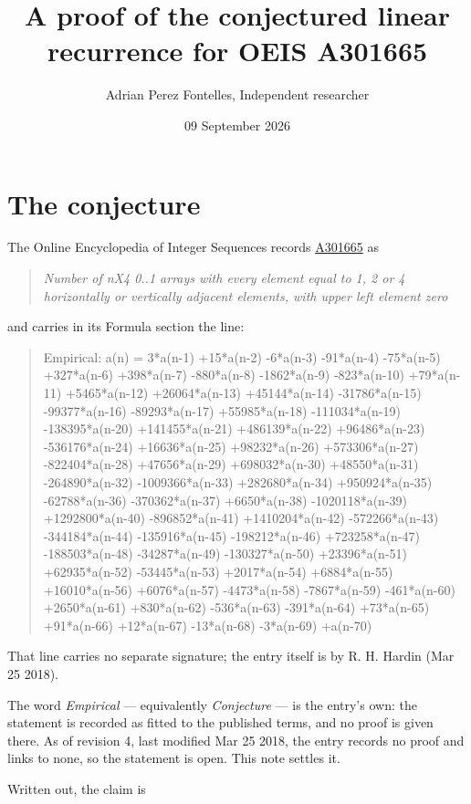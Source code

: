 \documentclass[11pt]{article}
\title{A proof of the conjectured linear recurrence for OEIS A301665}
\author{Adrian Perez Fontelles, Independent researcher}
\date{09 September 2026}
\theoremstyle{definition}
\begin{document}
\maketitle
\section{The conjecture}

The Online Encyclopedia of Integer Sequences records \href{https://oeis.org/A301665}{A301665} as

\begin{quote}\itshape Number of nX4 0..1 arrays with every element equal to 1, 2 or 4 horizontally or vertically adjacent elements, with upper left element zero\end{quote}

and carries in its Formula section the line:

\begin{quote}\ttfamily Empirical: a(n) = 3*a(n-1) +15*a(n-2) -6*a(n-3) -91*a(n-4) -75*a(n-5) +327*a(n-6) +398*a(n-7) -880*a(n-8) -1862*a(n-9) -823*a(n-10) +79*a(n-11) +5465*a(n-12) +26064*a(n-13) +45144*a(n-14) -31786*a(n-15) -99377*a(n-16) -89293*a(n-17) +55985*a(n-18) -111034*a(n-19) -138395*a(n-20) +141455*a(n-21) +486139*a(n-22) +96486*a(n-23) -536176*a(n-24) +16636*a(n-25) +98232*a(n-26) +573306*a(n-27) -822404*a(n-28) +47656*a(n-29) +698032*a(n-30) +48550*a(n-31) -264890*a(n-32) -1009366*a(n-33) +282680*a(n-34) +950924*a(n-35) -62788*a(n-36) -370362*a(n-37) +6650*a(n-38) -1020118*a(n-39) +1292800*a(n-40) -896852*a(n-41) +1410204*a(n-42) -572266*a(n-43) -344184*a(n-44) -135916*a(n-45) -198212*a(n-46) +723258*a(n-47) -188503*a(n-48) -34287*a(n-49) -130327*a(n-50) +23396*a(n-51) +62935*a(n-52) -53445*a(n-53) +2017*a(n-54) +6884*a(n-55) +16010*a(n-56) +6076*a(n-57) -4473*a(n-58) -7867*a(n-59) -461*a(n-60) +2650*a(n-61) +830*a(n-62) -536*a(n-63) -391*a(n-64) +73*a(n-65) +91*a(n-66) +12*a(n-67) -13*a(n-68) -3*a(n-69) +a(n-70)\end{quote}

That line carries no separate signature; the entry itself is by R. H. Hardin (Mar 25 2018).

The word {\itshape Empirical} --- equivalently {\itshape Conjecture} --- is the entry's own: the statement is recorded as fitted to the published terms, and no proof is given there. As of revision 4, last modified Mar 25 2018, the entry records no proof and links to none, so the statement is open. This note settles it.

Written out, the claim is
\end{document}
